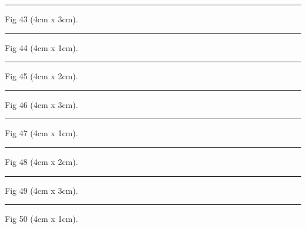 \documentclass[a4paper,11pt]{article}
\begin{document}
\begin{swarmwrap}%
  \begin{minipage}[t]{4cm}
    \centering
    \rule{\linewidth}{3cm}
    {\footnotesize Fig 43 (4cm x 3cm).}
  \end{minipage}%
\end{swarmwrap}%
\swarmwrapnext
\lipsum[43]%

\begin{swarmwrap}%
  \begin{minipage}[t]{4cm}
    \centering
    \rule{\linewidth}{1cm}
    {\footnotesize Fig 44 (4cm x 1cm).}
  \end{minipage}%
\end{swarmwrap}%
\swarmwrapnext
\lipsum[44]%

\begin{swarmwrap}%
  \begin{minipage}[t]{4cm}
    \centering
    \rule{\linewidth}{2cm}
    {\footnotesize Fig 45 (4cm x 2cm).}
  \end{minipage}%
\end{swarmwrap}%
\swarmwrapnext
\lipsum[45]%

\begin{swarmwrap}%
  \begin{minipage}[t]{4cm}
    \centering
    \rule{\linewidth}{3cm}
    {\footnotesize Fig 46 (4cm x 3cm).}
  \end{minipage}%
\end{swarmwrap}%
\swarmwrapnext
\lipsum[46]%

\begin{swarmwrap}%
  \begin{minipage}[t]{4cm}
    \centering
    \rule{\linewidth}{1cm}
    {\footnotesize Fig 47 (4cm x 1cm).}
  \end{minipage}%
\end{swarmwrap}%
\swarmwrapnext
\lipsum[47]%

\begin{swarmwrap}%
  \begin{minipage}[t]{4cm}
    \centering
    \rule{\linewidth}{2cm}
    {\footnotesize Fig 48 (4cm x 2cm).}
  \end{minipage}%
\end{swarmwrap}%
\swarmwrapnext
\lipsum[48]%

\begin{swarmwrap}%
  \begin{minipage}[t]{4cm}
    \centering
    \rule{\linewidth}{3cm}
    {\footnotesize Fig 49 (4cm x 3cm).}
  \end{minipage}%
\end{swarmwrap}%
\swarmwrapnext
\lipsum[49]%

\begin{swarmwrap}%
  \begin{minipage}[t]{4cm}
    \centering
    \rule{\linewidth}{1cm}
    {\footnotesize Fig 50 (4cm x 1cm).}
  \end{minipage}%
\end{swarmwrap}%
\swarmwrapnext
\lipsum[50]%
\end{document}
